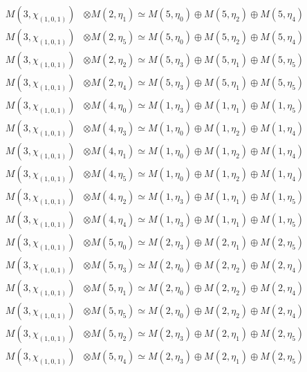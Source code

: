 \begin{align*}
M(3,\chi_{(1,0,1)}) &\otimes M(2,\eta_{1}) \simeq M(5,\eta_{0}) \oplus M(5,\eta_{2}) \oplus M(5,\eta_{4})\\
M(3,\chi_{(1,0,1)}) &\otimes M(2,\eta_{5}) \simeq M(5,\eta_{0}) \oplus M(5,\eta_{2}) \oplus M(5,\eta_{4})\\
M(3,\chi_{(1,0,1)}) &\otimes M(2,\eta_{2}) \simeq M(5,\eta_{3}) \oplus M(5,\eta_{1}) \oplus M(5,\eta_{5})\\
M(3,\chi_{(1,0,1)}) &\otimes M(2,\eta_{4}) \simeq M(5,\eta_{3}) \oplus M(5,\eta_{1}) \oplus M(5,\eta_{5})\\
M(3,\chi_{(1,0,1)}) &\otimes M(4,\eta_{0}) \simeq M(1,\eta_{3}) \oplus M(1,\eta_{1}) \oplus M(1,\eta_{5})\\
M(3,\chi_{(1,0,1)}) &\otimes M(4,\eta_{3}) \simeq M(1,\eta_{0}) \oplus M(1,\eta_{2}) \oplus M(1,\eta_{4})\\
M(3,\chi_{(1,0,1)}) &\otimes M(4,\eta_{1}) \simeq M(1,\eta_{0}) \oplus M(1,\eta_{2}) \oplus M(1,\eta_{4})\\
M(3,\chi_{(1,0,1)}) &\otimes M(4,\eta_{5}) \simeq M(1,\eta_{0}) \oplus M(1,\eta_{2}) \oplus M(1,\eta_{4})\\
M(3,\chi_{(1,0,1)}) &\otimes M(4,\eta_{2}) \simeq M(1,\eta_{3}) \oplus M(1,\eta_{1}) \oplus M(1,\eta_{5})\\
M(3,\chi_{(1,0,1)}) &\otimes M(4,\eta_{4}) \simeq M(1,\eta_{3}) \oplus M(1,\eta_{1}) \oplus M(1,\eta_{5})\\
M(3,\chi_{(1,0,1)}) &\otimes M(5,\eta_{0}) \simeq M(2,\eta_{3}) \oplus M(2,\eta_{1}) \oplus M(2,\eta_{5})\\
M(3,\chi_{(1,0,1)}) &\otimes M(5,\eta_{3}) \simeq M(2,\eta_{0}) \oplus M(2,\eta_{2}) \oplus M(2,\eta_{4})\\
M(3,\chi_{(1,0,1)}) &\otimes M(5,\eta_{1}) \simeq M(2,\eta_{0}) \oplus M(2,\eta_{2}) \oplus M(2,\eta_{4})\\
M(3,\chi_{(1,0,1)}) &\otimes M(5,\eta_{5}) \simeq M(2,\eta_{0}) \oplus M(2,\eta_{2}) \oplus M(2,\eta_{4})\\
M(3,\chi_{(1,0,1)}) &\otimes M(5,\eta_{2}) \simeq M(2,\eta_{3}) \oplus M(2,\eta_{1}) \oplus M(2,\eta_{5})\\
M(3,\chi_{(1,0,1)}) &\otimes M(5,\eta_{4}) \simeq M(2,\eta_{3}) \oplus M(2,\eta_{1}) \oplus M(2,\eta_{5})\\
\end{align*}


